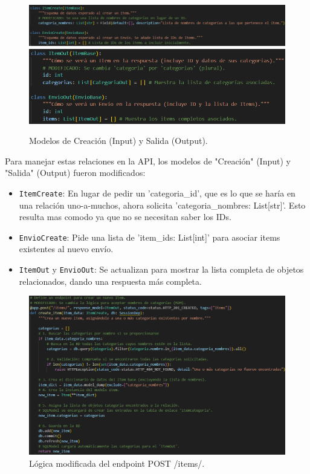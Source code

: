 \documentclass[12pt]{article}
\begin{document}
\begin{figure}[H]
    \centering
    \includegraphics[width=1\textwidth]{Imagenes/Prac4_3.1.png} 
    \includegraphics[width=1\textwidth]{Imagenes/Prac4_3.2.png}
    \caption{Modelos de Creación (Input) y Salida (Output).}
\end{figure}

Para manejar estas relaciones en la API, los modelos de "Creación" (Input) y "Salida" (Output) fueron modificados:
\begin{itemize}
    \item \texttt{ItemCreate}: En lugar de pedir un 'categoria\_id', que es lo que se haría en una relación uno-a-muchos, ahora solicita 'categoria\_nombres: List[str]'. Esto resulta mas comodo ya que no se necesitan saber los IDs.
    \item \texttt{EnvioCreate}: Pide una lista de 'item\_ids: List[int]' para asociar items existentes al nuevo envío.
    \item \texttt{ItemOut} y \texttt{EnvioOut}: Se actualizan para mostrar la lista completa de objetos relacionados, dando una respuesta más completa.
\end{itemize}

\begin{figure}[H]
    \centering
    \includegraphics[width=1\textwidth]{Imagenes/Prac4_4.1.png} 
    \caption{Lógica modificada del endpoint POST /items/.}
\end{figure}
\end{document}
